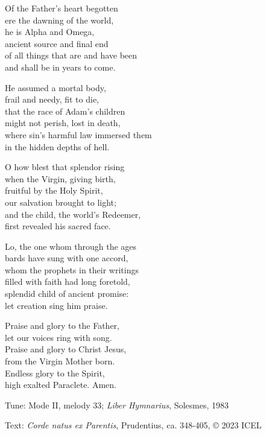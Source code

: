 \hymn

\settowidth{\versewidth}{where sin’s harmful law immersed them}

\begin{hymnverse}%
Of the Father’s heart begotten\\
ere the dawning of the world,\\
he is Alpha and Omega,\\
ancient source and final end\\
of all things that are and have been\\
and shall be in years to come.

He assumed a mortal body,\\
frail and needy, fit to die,\\
that the race of Adam’s children\\
might not perish, lost in death,\\
where sin’s harmful law immersed them\\
in the hidden depths of hell.

O how blest that splendor rising\\
when the Virgin, giving birth,\\
fruitful by the Holy Spirit,\\
our salvation brought to light;\\
and the child, the world’s Redeemer,\\
first revealed his sacred face.

Lo, the one whom through the ages\\
bards have sung with one accord,\\
whom the prophets in their writings\\
filled with faith had long foretold,\\
splendid child of ancient promise:\\
let creation sing him praise.

Praise and glory to the Father,\\
let our voices ring with song.\\
Praise and glory to Christ Jesus,\\
from the Virgin Mother born.\\
Endless glory to the Spirit,\\
high exalted Paraclete. Amen.
\end{hymnverse}

\begin{hymnsource}
Tune: Mode II, melody 33; \emph{Liber Hymnarius}, Solesmes, 1983

Text: \emph{Corde natus ex Parentis}, Prudentius, ca. 348-405, © 2023 ICEL
\end{hymnsource}